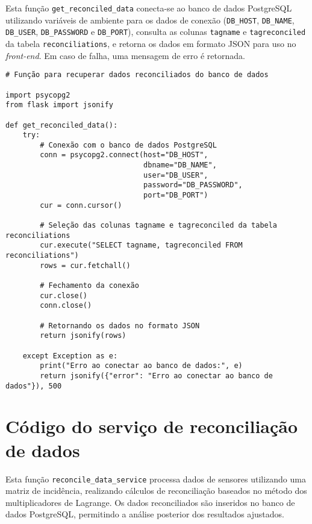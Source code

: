 Esta função \texttt{get\_reconciled\_data} conecta-se ao banco de dados PostgreSQL utilizando variáveis de ambiente para os dados de conexão (\texttt{DB\_HOST}, \texttt{DB\_NAME}, \texttt{DB\_USER}, \texttt{DB\_PASSWORD} e \texttt{DB\_PORT}), consulta as colunas \texttt{tagname} e \texttt{tagreconciled} da tabela \texttt{reconciliations}, e retorna os dados em formato JSON para uso no \textit{front-end}. Em caso de falha, uma mensagem de erro é retornada.

\begin{verbatim}
# Função para recuperar dados reconciliados do banco de dados

import psycopg2
from flask import jsonify

def get_reconciled_data():
    try:
        # Conexão com o banco de dados PostgreSQL
        conn = psycopg2.connect(host="DB_HOST", 
                                dbname="DB_NAME", 
                                user="DB_USER", 
                                password="DB_PASSWORD",
                                port="DB_PORT")
        cur = conn.cursor()

        # Seleção das colunas tagname e tagreconciled da tabela reconciliations
        cur.execute("SELECT tagname, tagreconciled FROM reconciliations")
        rows = cur.fetchall()

        # Fechamento da conexão
        cur.close()
        conn.close()

        # Retornando os dados no formato JSON
        return jsonify(rows)
    
    except Exception as e:
        print("Erro ao conectar ao banco de dados:", e)
        return jsonify({"error": "Erro ao conectar ao banco de dados"}), 500
\end{verbatim}



\chapter{Código do serviço de reconciliação de dados}
\label{Anexo:CodigoReconciliacaoDados}

Esta função \texttt{reconcile\_data\_service} processa dados de sensores utilizando uma matriz de incidência, realizando cálculos de reconciliação baseados no método dos multiplicadores de Lagrange. Os dados reconciliados são inseridos no banco de dados PostgreSQL, permitindo a análise posterior dos resultados ajustados.

